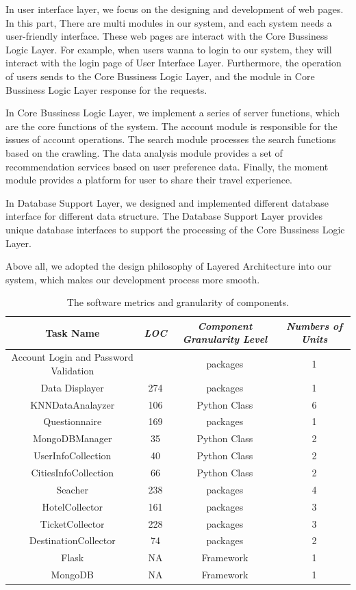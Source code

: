 \documentclass[conference]{IEEEtran}
\begin{document}
In user interface layer, we focus on the designing and development of web pages. In this part,  There are multi modules in our system, and each system needs a user-friendly interface. These web pages are interact with the Core Bussiness Logic Layer. For example, when users wanna to login to our system, they will interact with the login page of User Interface Layer. Furthermore, the operation of users sends to the Core Bussiness Logic Layer, and the module in Core Bussiness Logic Layer response for the requests.

In Core Bussiness Logic Layer, we implement a series of server functions, which are the core functions of the system. The account module is responsible for the issues of account operations. The search module processes the search functions based on the crawling. The data analysis module provides a set of recommendation services based on user preference data. Finally, the moment module provides a platform for user to share their travel experience.

In Database Support Layer, we designed and implemented different database interface for different data structure. The Database Support Layer provides unique database interfaces to support the processing of the Core Bussiness Logic Layer.

Above all, we adopted the design philosophy of Layered Architecture into our system, which makes our development process more smooth.



\begin{table}[htbp]
\caption{The software metrics and granularity of components.}
\begin{center}
\begin{tabular}{|c|c|c|c|}
\hline
\textbf{Task Name} & \textbf{\textit{LOC}}& \textbf{\textit{Component Granularity Level}}& \textbf{\textit{Numbers of Units}} \\
\hline
Account Login and Password Validation &  & packages & 1 \\
Data Displayer & 274  & packages & 1 \\
KNNDataAnalayzer & 106 & Python Class &  6 \\
Questionnaire & 169 & packages & 1 \\
MongoDBManager & 35 & Python Class & 2 \\
UserInfoCollection & 40 & Python Class & 2 \\
CitiesInfoCollection & 66 & Python Class & 2 \\
Seacher & 238 & packages & 4\\
HotelCollector & 161 & packages & 3\\
TicketCollector & 228 & packages & 3\\
DestinationCollector & 74 & packages & 2\\


Flask & NA & Framework & 1 \\
MongoDB & NA & Framework & 1 \\

\hline
\end{tabular}
\label{tab1}
\end{center}
\end{table}
\end{document}
